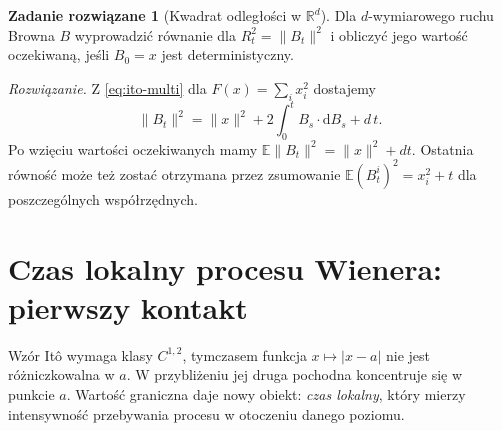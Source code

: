 \documentclass[11pt,a4paper,oneside]{report}
\numberwithin{equation}{chapter}
\theoremstyle{plain}
\theoremstyle{definition}
\newtheorem{zadanie}{Zadanie rozwiązane}[chapter]
\theoremstyle{remark}
\newcommand{\R}{\mathbb{R}}
\newcommand{\E}{\mathbb{E}}
\newcommand{\dd}{\mathrm{d}}
\newcommand{\norm}[1]{\lVert #1\rVert}
\begin{document}
\begin{zadanie}[Kwadrat odległości w $\R^d$]
Dla $d$-wymiarowego ruchu Browna $B$ wyprowadzić
równanie dla $R_t^2=\norm{B_t}^2$ i obliczyć jego
wartość oczekiwaną, jeśli $B_0=x$ jest deterministyczny.

\emph{Rozwiązanie.} Z \eqref{eq:ito-multi} dla
$F(x)=\sum_i x_i^2$ dostajemy
\[
\norm{B_t}^2=\norm{x}^2+2\int_0^t B_s\cdot\dd B_s+d\,t.
\]
Po wzięciu wartości oczekiwanych mamy
$\E\norm{B_t}^2=\norm{x}^2+dt$. Ostatnia równość
może też zostać otrzymana przez zsumowanie
$\E(B_t^i)^2=x_i^2+t$ dla poszczególnych współrzędnych.
\end{zadanie}

\section{Czas lokalny procesu Wienera: pierwszy kontakt}
Wzór Itô wymaga klasy $C^{1,2}$, tymczasem
funkcja $x\mapsto|x-a|$ nie jest różniczkowalna w $a$.
W przybliżeniu jej druga pochodna koncentruje się
w punkcie $a$. Wartość graniczna daje nowy obiekt:
\emph{czas lokalny}, który mierzy intensywność
przebywania procesu w otoczeniu danego poziomu.
\end{document}

